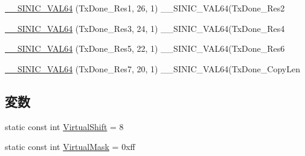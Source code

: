 \begin{DoxyCompactItemize}
\item 
\hyperlink{namespaceSinic_1_1Regs_ab8855564b0d8a0f52607d6b83fd6c6ab}{\_\-\_\-SINIC\_\-VAL64} (TxDone\_\-Res1, 26, 1) \_\-\_\-SINIC\_\-VAL64(TxDone\_\-Res2
\item 
\hyperlink{namespaceSinic_1_1Regs_a4bd7c6ed99d7e28ea474505fc26ef0c7}{\_\-\_\-SINIC\_\-VAL64} (TxDone\_\-Res3, 24, 1) \_\-\_\-SINIC\_\-VAL64(TxDone\_\-Res4
\item 
\hyperlink{namespaceSinic_1_1Regs_a5f79ddf6ede0e8be182ff9a7cf66f912}{\_\-\_\-SINIC\_\-VAL64} (TxDone\_\-Res5, 22, 1) \_\-\_\-SINIC\_\-VAL64(TxDone\_\-Res6
\item 
\hyperlink{namespaceSinic_1_1Regs_a580467be57553482595f25dc434f86c8}{\_\-\_\-SINIC\_\-VAL64} (TxDone\_\-Res7, 20, 1) \_\-\_\-SINIC\_\-VAL64(TxDone\_\-CopyLen
\end{DoxyCompactItemize}
\subsection*{変数}
\begin{DoxyCompactItemize}
\item 
static const int \hyperlink{namespaceSinic_1_1Regs_ad3df16c90c6e9c90e4fe95c9ad269661}{VirtualShift} = 8
\item 
static const int \hyperlink{namespaceSinic_1_1Regs_aac1ea6e4b2ca262e0a4bb0b729a7ef3e}{VirtualMask} = 0xff
\end{DoxyCompactItemize}


